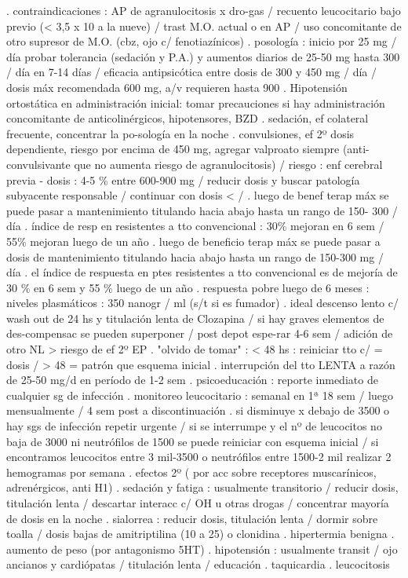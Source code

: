 . contraindicaciones : AP de agranulocitosis x dro-gas / recuento leucocitario bajo previo (< 3,5 x 10 a la nueve) / trast M.O. actual o en AP / uso concomitante de otro supresor de M.O. (cbz, ojo c/ fenotiazínicos)
. posología : inicio por 25 mg / día probar tolerancia (sedación y P.A.) y aumentos diarios de 25-50 mg hasta 300 / día en 7-14 días / eficacia antipsicótica entre dosis de 300 y 450 mg / día / dosis máx recomendada 600 mg, a/v requieren hasta 900
. Hipotensión ortostática en administración inicial: tomar precauciones si hay administración concomitante de anticolinérgicos, hipotensores, BZD
. sedación, ef colateral frecuente, concentrar la po-sología en la noche
. convulsiones, ef 2º dosis dependiente, riesgo por encima de 450 mg, agregar valproato siempre (anti-convulsivante que no aumenta riesgo de agranulocitosis) / riesgo : enf cerebral previa - dosis : 4-5 \% entre 600-900 mg / reducir dosis y buscar patología subyacente responsable / continuar con dosis < /
. luego de benef terap máx se puede pasar a mantenimiento titulando hacia abajo hasta un rango de 150- 300 / día
. índice de resp en resistentes a tto convencional : 30\% mejoran en 6 sem / 55\% mejoran luego de un año
. luego de beneficio terap máx se puede pasar a dosis de mantenimiento titulando hacia abajo hasta un rango de 150-300 mg / día
. el índice de respuesta en ptes resistentes a tto convencional es de mejoría de 30 \% en 6 sem y 55 \% luego de un año
. respuesta pobre luego de 6 meses : niveles plasmáticos : 350 nanogr / ml (s/t si es fumador)
. ideal descenso lento c/ wash out de 24 hs y titulación lenta de Clozapina / si hay graves elementos de des-compensac se pueden superponer / post depot espe-rar 4-6 sem / adición de otro NL > riesgo de ef 2º EP
. "olvido de tomar" : < 48 hs : reiniciar tto c/ = dosis / > 48 = patrón que esquema inicial
. interrupción del tto LENTA a razón de 25-50 mg/d en período de 1-2 sem
. psicoeducación : reporte inmediato de cualquier sg de infección
. monitoreo leucocitario : semanal en 1ª 18 sem / luego mensualmente / 4 sem post a discontinuación
. si disminuye x debajo de 3500 o hay sgs de infección repetir urgente / si se interrumpe y el nº de leucocitos no baja de 3000 ni neutrófilos de 1500 se puede reiniciar con esquema inicial / si encontramos leucocitos entre 3 mil-3500 o neutrófilos entre 1500-2 mil realizar 2 hemogramas por semana
. efectos 2º ( por acc sobre receptores muscarínicos, adrenérgicos, anti H1)
. sedación y fatiga : usualmente transitorio / reducir dosis, titulación lenta / descartar interacc c/ OH u otras drogas / concentrar mayoría de dosis en la noche
. sialorrea : reducir dosis, titulación lenta / dormir sobre toalla / dosis bajas de amitriptilina (10 a 25) o clonidina
. hipertermia benigna
. aumento de peso (por antagonismo 5HT)
. hipotensión : usualmente transit / ojo ancianos y cardiópatas / titulación lenta / educación
. taquicardia
. leucocitosis


